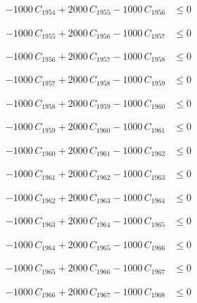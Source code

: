 \documentclass[a4paper,11pt]{article}
\begin{document}
\begin{align}
-1000\,C_{1954} + 2000\,C_{1955} - 1000\,C_{1956} &\leq 0 \nonumber
\end{align}

\begin{align}
-1000\,C_{1955} + 2000\,C_{1956} - 1000\,C_{1957} &\leq 0 \nonumber
\end{align}

\begin{align}
-1000\,C_{1956} + 2000\,C_{1957} - 1000\,C_{1958} &\leq 0 \nonumber
\end{align}

\begin{align}
-1000\,C_{1957} + 2000\,C_{1958} - 1000\,C_{1959} &\leq 0 \nonumber
\end{align}

\begin{align}
-1000\,C_{1958} + 2000\,C_{1959} - 1000\,C_{1960} &\leq 0 \nonumber
\end{align}

\begin{align}
-1000\,C_{1959} + 2000\,C_{1960} - 1000\,C_{1961} &\leq 0 \nonumber
\end{align}

\begin{align}
-1000\,C_{1960} + 2000\,C_{1961} - 1000\,C_{1962} &\leq 0 \nonumber
\end{align}

\begin{align}
-1000\,C_{1961} + 2000\,C_{1962} - 1000\,C_{1963} &\leq 0 \nonumber
\end{align}

\begin{align}
-1000\,C_{1962} + 2000\,C_{1963} - 1000\,C_{1964} &\leq 0 \nonumber
\end{align}

\begin{align}
-1000\,C_{1963} + 2000\,C_{1964} - 1000\,C_{1965} &\leq 0 \nonumber
\end{align}

\begin{align}
-1000\,C_{1964} + 2000\,C_{1965} - 1000\,C_{1966} &\leq 0 \nonumber
\end{align}

\begin{align}
-1000\,C_{1965} + 2000\,C_{1966} - 1000\,C_{1967} &\leq 0 \nonumber
\end{align}

\begin{align}
-1000\,C_{1966} + 2000\,C_{1967} - 1000\,C_{1968} &\leq 0 \nonumber
\end{align}
\end{document}
